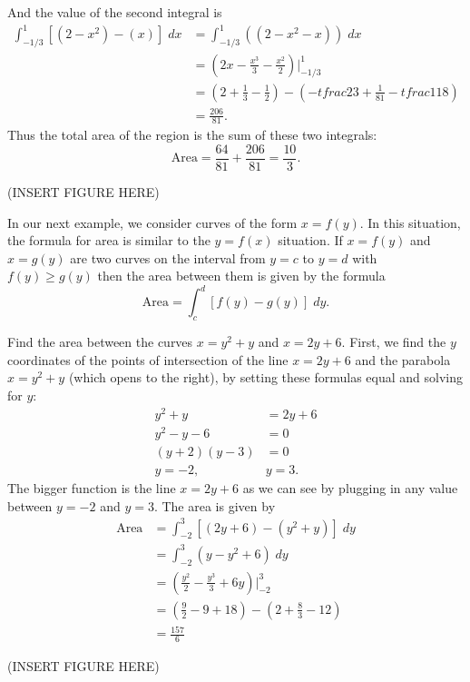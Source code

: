 \documentclass{ximera}
\begin{document}
\begin{example}
And the value of the second integral is
\begin{align*}
\int_{-1/3}^{1} \left[(2 - x^2) - (x)\right] \; dx &= \int_{-1/3}^{1} \left((2 - x^2 - x)\right) \; dx \\
                                                        &= \left(2x - \frac{x^3}{3} -\frac{x^2}{2} \right)\bigg|_{-1/3}^{1} \\
                                                        &= \left(2 + \tfrac{1}{3} - \tfrac12 \right) - \left(-tfrac23 + \tfrac{1}{81} -tfrac{1}{18} \right) \\
                                                        &= \tfrac{206}{81}.
\end{align*}
Thus the total area of the region is the sum of these two integrals:
\[
\text{Area} = \frac{64}{81} + \frac{206}{81} = \frac{10}{3}.
\]

(INSERT FIGURE HERE)

\end{example}

In our next example, we consider curves of the form $x = f(y)$. In this situation, the formula for area is similar to the $y = f(x)$ situation.
If $x = f(y)$ and $x=g(y)$ are two curves on the interval from $y = c$ to $y = d$ with $f(y) \geq g(y)$
then the area between them is given by the formula
\[
\text{Area} = \int_c^d [f(y) - g(y)] \; dy.
\]
\begin{example}
Find the area between the curves $x = y^2 + y$ and $x = 2y + 6$.
First, we find the $y$ coordinates of the points of intersection of the line $x = 2y+6$ 
and the parabola $x=y^2 + y$ (which opens to the right), by setting these formulas equal and solving for $y$:
\begin{align*}
y^2 + y &= 2y + 6 \\
y^2 - y - 6 &= 0 \\
(y+2)(y-3) &= 0 \\
y = -2, & y = 3.
\end{align*}
The bigger function is the line $x = 2y+6$ as we can see by plugging in any value between $y = -2$ and $y=3$.
The area is given by
\begin{align*}
\text{Area} &= \int_{-2}^3 \left[(2y+6) - (y^2+y) \right] \; dy \\
            &= \int_{-2}^3 \left(y - y^2 + 6\right) \; dy \\
            &= \left(\frac{y^2}{2} - \frac{y^3}{3} + 6y \right) \bigg|_{-2}^{3} \\
            &= \left(\tfrac92 - 9 + 18\right) - \left(2 + \tfrac83 - 12\right)\\
            &= \tfrac{157}{6}         
\end{align*}

(INSERT FIGURE HERE)


\end{example}
\end{document}
